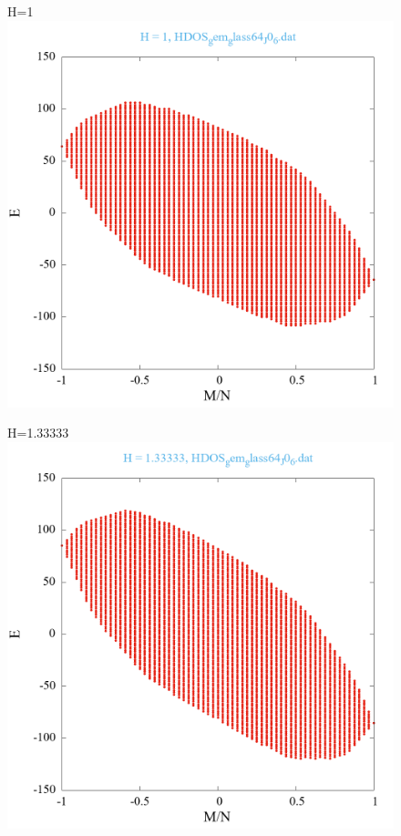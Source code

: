 \documentclass[utf8, babel, sor, jor, amsmath, amssymb, reprint]{elsarticle} %
\begin{document}
\begin{figure}[H]
\begin{minipage}[h]{0.45\linewidth}
	\end{minipage}
	\vfill
	\begin{minipage}[h]{0.45\linewidth}
		\centering H=1
		\includegraphics[width=1\linewidth]{HDOS_gem_glass64_J0_6.dat_H1.png}
	\end{minipage}
	\hfill
	\begin{minipage}[h]{0.45\linewidth}
		\centering H=1.33333
		\includegraphics[width=1\linewidth]{HDOS_gem_glass64_J0_6.dat_H1.33333.png}

\end{minipage}
\end{figure}
\end{document}
